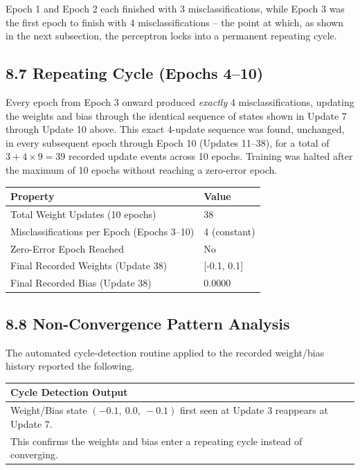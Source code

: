 \documentclass[11pt,a4paper]{article}
\begin{document}
\vspace{0.15cm}

Epoch 1 and Epoch 2 each finished with 3 misclassifications, while Epoch 3 was the first epoch to finish with 4 misclassifications -- the point at which, as shown in the next subsection, the perceptron locks into a permanent repeating cycle.


\subsection*{8.7 Repeating Cycle (Epochs 4--10)}

Every epoch from Epoch 3 onward produced \textit{exactly} 4 misclassifications, updating the weights and bias through the identical sequence of states shown in Update 7 through Update 10 above. This exact 4-update sequence was found, unchanged, in every subsequent epoch through Epoch 10 (Updates 11--38), for a total of $3+4\times9=39$ recorded update events across 10 epochs. Training was halted after the maximum of 10 epochs without reaching a zero-error epoch.

\begin{center}
\begin{tabular}{|p{6cm}|p{6cm}|}
\hline
\textbf{Property} & \textbf{Value}\\
\hline
Total Weight Updates (10 epochs) & 38\\
\hline
Misclassifications per Epoch (Epochs 3--10) & 4 (constant)\\
\hline
Zero-Error Epoch Reached & No\\
\hline
Final Recorded Weights (Update 38) & [-0.1, 0.1]\\
\hline
Final Recorded Bias (Update 38) & 0.0000\\
\hline
\end{tabular}
\end{center}

\newpage
\subsection*{8.8 Non-Convergence Pattern Analysis}

The automated cycle-detection routine applied to the recorded weight/bias history reported the following.

\begin{center}
\begin{tabular}{|p{10cm}|}
\hline
\textbf{Cycle Detection Output}\\
\hline
Weight/Bias state $(-0.1,\ 0.0,\ -0.1)$ first seen at Update 3 reappears at Update 7.\\
\hline
This confirms the weights and bias enter a repeating cycle instead of converging.\\
\hline
\end{tabular}
\end{center}
\end{document}
